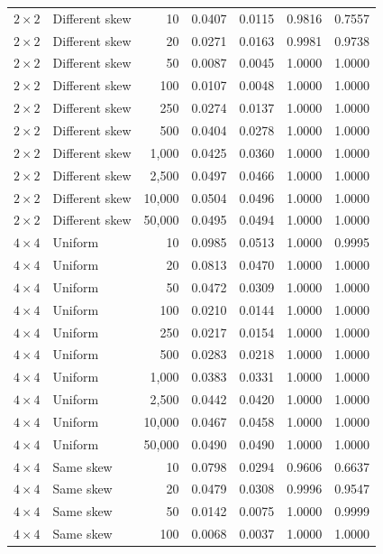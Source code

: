 \begin{longtable}{@{}llrrrrr@{}}
\(2\times2\) & Different skew & 10 & 0.0407 & 0.0115 & 0.9816 & 0.7557\\
\(2\times2\) & Different skew & 20 & 0.0271 & 0.0163 & 0.9981 & 0.9738\\
\(2\times2\) & Different skew & 50 & 0.0087 & 0.0045 & 1.0000 & 1.0000\\
\(2\times2\) & Different skew & 100 & 0.0107 & 0.0048 & 1.0000 & 1.0000\\
\(2\times2\) & Different skew & 250 & 0.0274 & 0.0137 & 1.0000 & 1.0000\\
\(2\times2\) & Different skew & 500 & 0.0404 & 0.0278 & 1.0000 & 1.0000\\
\(2\times2\) & Different skew & 1,000 & 0.0425 & 0.0360 & 1.0000 & 1.0000\\
\(2\times2\) & Different skew & 2,500 & 0.0497 & 0.0466 & 1.0000 & 1.0000\\
\(2\times2\) & Different skew & 10,000 & 0.0504 & 0.0496 & 1.0000 & 1.0000\\
\(2\times2\) & Different skew & 50,000 & 0.0495 & 0.0494 & 1.0000 & 1.0000\\
\midrule
\(4\times4\) & Uniform & 10 & 0.0985 & 0.0513 & 1.0000 & 0.9995\\
\(4\times4\) & Uniform & 20 & 0.0813 & 0.0470 & 1.0000 & 1.0000\\
\(4\times4\) & Uniform & 50 & 0.0472 & 0.0309 & 1.0000 & 1.0000\\
\(4\times4\) & Uniform & 100 & 0.0210 & 0.0144 & 1.0000 & 1.0000\\
\(4\times4\) & Uniform & 250 & 0.0217 & 0.0154 & 1.0000 & 1.0000\\
\(4\times4\) & Uniform & 500 & 0.0283 & 0.0218 & 1.0000 & 1.0000\\
\(4\times4\) & Uniform & 1,000 & 0.0383 & 0.0331 & 1.0000 & 1.0000\\
\(4\times4\) & Uniform & 2,500 & 0.0442 & 0.0420 & 1.0000 & 1.0000\\
\(4\times4\) & Uniform & 10,000 & 0.0467 & 0.0458 & 1.0000 & 1.0000\\
\(4\times4\) & Uniform & 50,000 & 0.0490 & 0.0490 & 1.0000 & 1.0000\\
\(4\times4\) & Same skew & 10 & 0.0798 & 0.0294 & 0.9606 & 0.6637\\
\(4\times4\) & Same skew & 20 & 0.0479 & 0.0308 & 0.9996 & 0.9547\\
\(4\times4\) & Same skew & 50 & 0.0142 & 0.0075 & 1.0000 & 0.9999\\
\(4\times4\) & Same skew & 100 & 0.0068 & 0.0037 & 1.0000 & 1.0000\\

\end{longtable}

